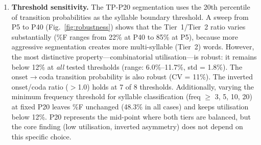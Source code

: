 \begin{enumerate}[nosep]
  \item \textbf{Threshold sensitivity.}  The TP-P20 segmentation uses the 20th percentile of transition probabilities as the syllable boundary threshold.  A sweep from P5 to P40 (Fig.~\ref{fig:robustness}) shows that the Tier~1/Tier~2 ratio varies substantially (\%F ranges from 22\% at P40 to 85\% at P5), because more aggressive segmentation creates more multi-syllable (Tier~2) words.  However, the most distinctive property---combinatorial utilisation---is robust: it remains below 12\% at \emph{all} tested thresholds (range: 6.0\%--11.7\%, std = 1.8\%).  The onset$\to$coda transition probability is also robust (CV = 11\%).  The inverted onset/coda ratio ($>$1.0) holds at 7 of 8 thresholds.  Additionally, varying the minimum frequency threshold for syllable classification (freq $\geq$ 3, 5, 10, 20) at fixed P20 leaves \%F unchanged (48.3\% in all cases) and keeps utilisation below 12\%.  P20 represents the mid-point where both tiers are balanced, but the core finding (low utilisation, inverted asymmetry) does not depend on this specific choice.


\end{enumerate}
